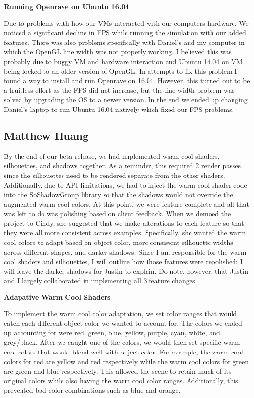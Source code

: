 \documentclass[10pt,journal,compsoc,draftclsnofoot]{IEEEtran}
\begin{document}
\begin{flushleft}
\textbf{Running Openrave on Ubuntu 16.04}
\par
Due to problems with how our VMs interacted with our computers hardware.
We noticed a significant decline in FPS while running the simulation with our added features.
There was also problems specifically with Daniel's and my computer in which the OpenGL line width was not properly working.
I believed this was probably due to buggy VM and hardware interaction and Ubuntu 14.04 on VM being locked to an older version of OpenGL.
In attempts to fix this problem I found a way to install and run Openrave on 16.04.
However, this turned out to be a fruitless effort as the FPS did not increase, but the line width problem was solved by upgrading the OS to a newer version.
In the end we ended up changing Daniel's laptop to run Ubuntu 16.04 natively which fixed our FPS problems.
\vspace{3mm}

\newpage

\subsection{Matthew Huang}
\par
By the end of our beta release, we had implemented warm cool shaders, silhouettes, and shadows together.
As a reminder, this required 2 render passes since the silhouettes need to be rendered separate from the other shaders.
Additionally, due to API limitations, we had to inject the warm cool shader code into the SoShadowGroup library so that the shadows would not override the augmented warm cool colors.
At this point, we were feature complete and all that was left to do was polishing based on client feedback.
When we demoed the project to Cindy, she suggested that we make alterations to each feature so that they were all more consistent across examples.
Specifically, she wanted the warm cool colors to adapt based on object color, more consistent silhouette widths across different shapes, and darker shadows.
Since I am responsible for the warm cool shaders and silhouettes, I will outline how those features were repolished; I will leave the darker shadows for Justin to explain.
Do note, however, that Justin and I largely collaborated in implementing all 3 feature changes.
\vspace{3mm}

\textbf{Adapative Warm Cool Shaders}
\par
To implement the warm cool color adaptation, we set color ranges that would catch each different object color we wanted to account for.
The colors we ended up accounting for were red, green, blue, yellow, purple, cyan, white, and grey/black.
After we caught one of the colors, we would then set specific warm cool colors that would blend well with object color.
For example, the warm cool colors for red are yellow and red respectively while the warm cool colors for green are green and blue respectively.
This allowed the scene to retain much of its original colors while also having the warm cool color ranges.
Additionally, this prevented bad color combinations such as blue and orange.
\vspace{3mm}


\end{flushleft}
\end{document}

